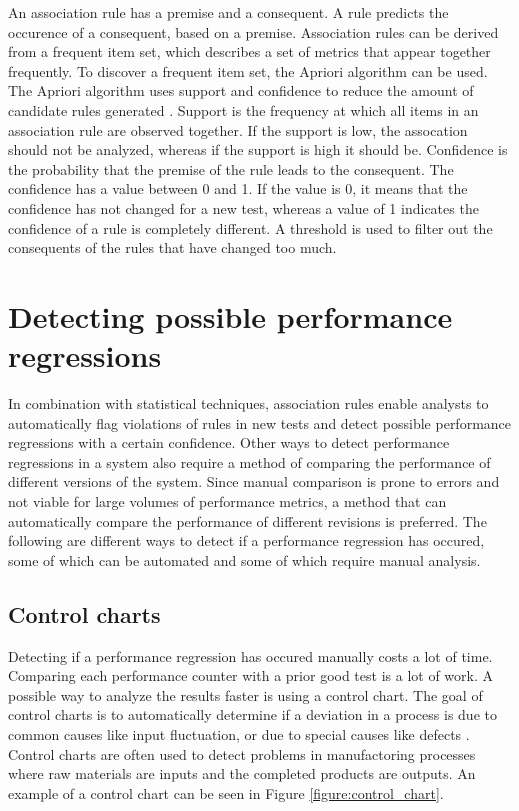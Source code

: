 An association rule has a premise and a consequent. A rule predicts the occurence of a consequent, based on a premise. Association rules can be derived from a frequent item set, which describes a set of metrics that appear together frequently. To discover a frequent item set, the Apriori algorithm can be used. The Apriori algorithm uses support and confidence to reduce the amount of candidate rules generated \cite{foo2010mining}.
Support is the frequency at which all items in an association rule are observed together. If the support is low, the assocation should not be analyzed, whereas if the support is high it should be. Confidence is the probability that the  premise of the rule leads to the consequent. The confidence has a value between 0 and 1. If the value is 0, it means that the confidence has not changed for a new test, whereas a value of 1 indicates the confidence of a rule is completely different. A threshold is used to filter out the consequents of the rules that have changed too much.

\section{Detecting possible performance regressions}
In combination with statistical techniques, association rules enable analysts to automatically flag violations of rules in new tests and detect possible performance regressions with a certain confidence. Other ways to detect performance regressions in a system also require a method of comparing the performance of different versions of the system. Since manual comparison is prone to errors and not viable for large volumes of performance metrics, a method that can automatically compare the performance of different revisions is preferred. The following are different ways to detect if a performance regression has occured, some of which can be automated and some of which require manual analysis.

\subsection{Control charts}
Detecting if a performance regression has occured manually costs a lot of time. Comparing each performance counter with a prior good test is a lot of work. A possible way to analyze the results faster is using a control chart. The goal of control charts is to automatically determine if a deviation in a process is due to common causes like input fluctuation, or due to special causes like defects \cite{nguyen2012using}. Control charts are often used to detect problems in manufactoring processes where raw materials are inputs and the completed products are outputs. An example of a control chart can be seen in Figure \ref{figure:control_chart}.

